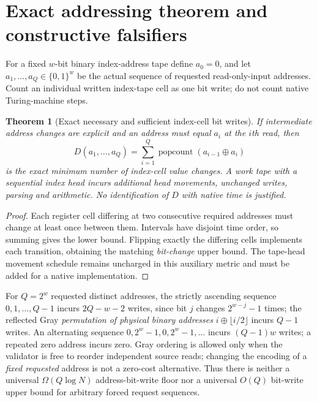 \documentclass[11pt]{article}
\newtheorem{theorem}{Theorem}
\begin{document}
\section*{Exact addressing theorem and constructive falsifiers}
For a fixed $w$-bit binary index-address tape define $a_0=0$, and let $a_1,\ldots,a_Q\in\{0,1\}^w$ be the actual sequence of requested read-only-input addresses. Count an individual written index-tape cell as one bit write; do not count native Turing-machine steps.
\begin{theorem}[Exact necessary and sufficient index-cell bit writes]
If intermediate address changes are explicit and an address must equal $a_i$ at the $i$th read, then
\[
D(a_1,\dots,a_Q)=\sum_{i=1}^{Q}\operatorname{popcount}(a_{i-1}\oplus a_i)
\]
is the exact minimum number of index-cell value changes. A work tape with a sequential index head incurs \emph{additional} head movements, unchanged writes, parsing and arithmetic. No identification of $D$ with native time is justified.
\end{theorem}
\begin{proof}
Each register cell differing at two consecutive required addresses must change at least once between them. Intervals have disjoint time order, so summing gives the lower bound. Flipping exactly the differing cells implements each transition, obtaining the matching \emph{bit-change} upper bound. The tape-head movement schedule remains uncharged in this auxiliary metric and must be added for a native implementation.
\end{proof}
For $Q=2^w$ requested distinct addresses, the strictly ascending sequence $0,1,\ldots,Q-1$ incurs $2Q-w-2$ writes, since bit $j$ changes $2^{w-j}-1$ times; the reflected Gray \emph{permutation of physical binary addresses} $i\oplus\lfloor i/2\rfloor$ incurs $Q-1$ writes. An alternating sequence $0,2^w-1,0,2^w-1,\ldots$ incurs $(Q-1)w$ writes; a repeated zero address incurs zero. Gray ordering is allowed only when the validator is free to reorder independent source reads; changing the encoding of a \emph{fixed requested} address is not a zero-cost alternative. Thus there is neither a universal $\Omega(Q\log N)$ address-bit-write floor nor a universal $O(Q)$ bit-write upper bound for arbitrary forced request sequences.
\end{document}
